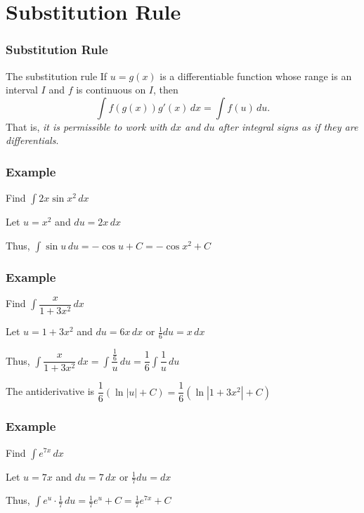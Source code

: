 \documentclass[t]{beamer}
\theoremstyle{plain}
\theoremstyle{definition}
\newcommand{\ds}{\displaystyle}
\begin{document}
\section{Substitution Rule}

\begin{frame}
\frametitle{Substitution Rule}
\begin{block}{The substitution rule}
If $u = g(x)$ is a differentiable function whose range is an interval $I$ and $f$ is continuous on $I$, then
\[ \int f(g(x))g'(x)\,dx = \int f(u)\,du.\]
That is, \emph{it is permissible to work with $dx$ and $du$ after integral signs as if they are differentials}.
\end{block}

\end{frame}

\begin{frame}

\frametitle{Example}

Find $\ds \int 2x \sin{x^2} \,dx $ \pause

\medskip

Let $u = x^2$ and $du = 2x \, dx$

\medskip

Thus,  $\ds \int \sin{u} \,du  =  -\cos{u} + C = -\cos{x^2} + C$

\end{frame}

\begin{frame}

\frametitle{Example}

Find $\ds \int \dfrac{x}{1 + 3x^2} \,dx $ \pause

\medskip

Let $u = 1 + 3x^2$ and $du = 6x \, dx$ or $\frac{1}{6} du = x \, dx$

\medskip

Thus,  $\ds \int \dfrac{x}{1 + 3x^2} \,dx  = \ds \int \dfrac{\frac{1}{6}}{u} \,du  = \dfrac{1}{6} \int \dfrac{1}{u} \, du$

\medskip

The antiderivative is $\dfrac{1}{6} (\ln{|u|} + C) = \dfrac{1}{6} (\ln{|1 + 3x^2|} + C)$

\end{frame}

\begin{frame}

\frametitle{Example}

Find $\ds \int e^{7x} \,dx $ \pause

\medskip

Let $u = 7x$ and $du = 7 \, dx$ or $\frac{1}{7}du = dx$

\medskip

Thus,   $\ds \int e^{u} \cdot \frac{1}{7} \,du  = \frac{1}{7} e^{u} + C =  \frac{1}{7} e^{7x} + C$

\end{frame}
\end{document}
